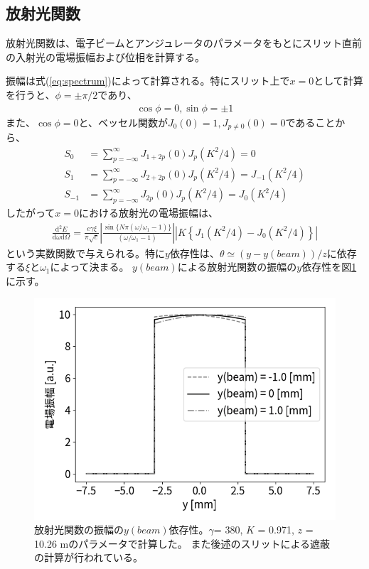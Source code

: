 \documentclass[a4paper,11pt,uplatex]{jsbook}
\begin{document}
\subsection{放射光関数}
放射光関数は、電子ビームとアンジュレータのパラメータをもとにスリット直前の入射光の電場振幅および位相を計算する。

振幅は式(\ref{eq:spectrum})によって計算される。特にスリット上で$x=0$として計算を行うと、$\phi = \pm\pi/2$であり、 
\begin{align}
  \cos \phi = 0, \sin \phi = \pm 1
\end{align}
また、$\cos \phi = 0$と、ベッセル関数が$J_0(0) = 1, J_{p\ne 0}(0) = 0$であることから、
\begin{align}
  S_0 &= \sum_{p = -\infty}^{\infty} J_{1+2p}(0)J_p(K^2/4)  = 0 \\
  S_1 &= \sum_{p = -\infty}^{\infty} J_{2+2p}(0)J_p(K^2/4)  =  J_{-1}(K^2/4)\\
  S_{-1} &= \sum_{p = -\infty}^{\infty} J_{2p}(0)J_p(K^2/4) = J_0(K^2/4)
\end{align}
したがって$x=0$における放射光の電場振幅は、
\begin{align}
  \frac{\text{d}^2E}{\text{d}\omega \text{d}\Omega} = \frac{e\gamma\xi}{\pi \sqrt{c}}\left| \frac{\sin \{N\pi(\omega/\omega_1 -1)\}}{(\omega/\omega_1 -1)} \right|
  \left| K\left\{ J_1(K^2/4) - J_0(K^2/4) \right\} \right|
\end{align}
という実数関数で与えられる。特に$y$依存性は、$\theta \simeq (y -y(beam))/ z$に依存する$\xi$と$\omega_1$によって決まる。
$y(beam)$による放射光関数の振幅の$y$依存性を図\ref{fig:ybeam}に示す。
\begin{figure}[H]
  \centering
  \includegraphics[width = 0.8\linewidth]{image/2-ybeam.png}
  \caption[放射光関数のビーム位置依存性]{放射光関数の振幅の$y(beam)$依存性。$\gamma$= 380, $K$ = 0.971, $z$ = 10.26 mのパラメータで計算した。
  また後述のスリットによる遮蔽の計算が行われている。}
  \label{fig:ybeam}
\end{figure}
\end{document}
